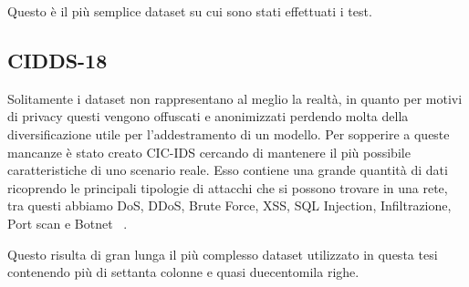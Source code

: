 Questo è il più semplice dataset su cui sono stati effettuati i test.

\subsection{CIDDS-18}

Solitamente i dataset non rappresentano al meglio la realtà, in quanto per motivi di privacy questi vengono offuscati e anonimizzati perdendo molta della diversificazione utile per l'addestramento di un modello.
Per sopperire a queste mancanze è stato creato CIC-IDS cercando di mantenere il più possibile caratteristiche di uno scenario reale.
Esso contiene una grande quantità di dati ricoprendo le principali tipologie di attacchi che si possono trovare in una rete, tra questi abbiamo DoS, DDoS, Brute Force, XSS, SQL Injection, Infiltrazione, Port scan e Botnet ~\cite{sharafaldinGeneratingNewIntrusion2018}.

Questo risulta di gran lunga il più complesso dataset utilizzato in questa tesi contenendo più di settanta colonne e quasi duecentomila righe.

